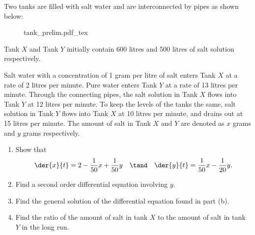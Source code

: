 \begin{problem}
    Two tanks are filled with salt water and are interconnected by pipes as shown below:

    \begin{figure}[H]
        \centering
        {tank_prelim.pdf_tex}
    \end{figure}

    Tank $X$ and Tank $Y$ initially contain 600 litres and 500 litres of salt solution respectively.

    Salt water with a concentration of 1 gram per litre of salt enters Tank $X$ at a rate of 2 litres per minute. Pure water enters Tank $Y$ at a rate of 13 litres per minute. Through the connecting pipes, the salt solution in Tank $X$ flows into Tank $Y$ at 12 litres per minute. To keep the levels of the tanks the same, salt solution in Tank $Y$ flows into Tank $X$ at 10 litres per minute, and drains out at 15 litres per minute. The amount of salt in Tank $X$ and $Y$ are denoted as $x$ grams and $y$ grams respectively.

    \begin{enumerate}
        \item Show that \[\der{x}{t} = 2 - \frac1{50} x + \frac1{50} y \quad \tand \quad \der{y}{t} = \frac1{50} x - \frac1{20} y.\]
        \item Find a second order differential equation involving $y$.
        \item Find the general solution of the differential equation found in part (b).
        \item Find the ratio of the amount of salt in tank $X$ to the amount of salt in tank $Y$ in the long run.
    \end{enumerate}
\end{problem}